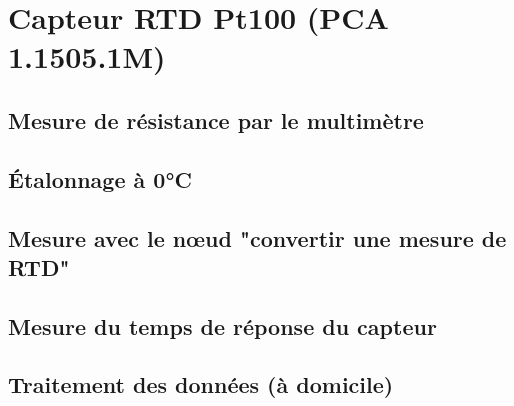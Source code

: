 \section{Capteur RTD Pt100 (PCA 1.1505.1M)}

\subsection{Mesure de résistance par le multimètre}

\subsection{Étalonnage à 0°C}

\subsection{Mesure avec le nœud "convertir une mesure de RTD"}

\subsection{Mesure du temps de réponse du capteur}

\subsection{Traitement des données (à domicile)}
